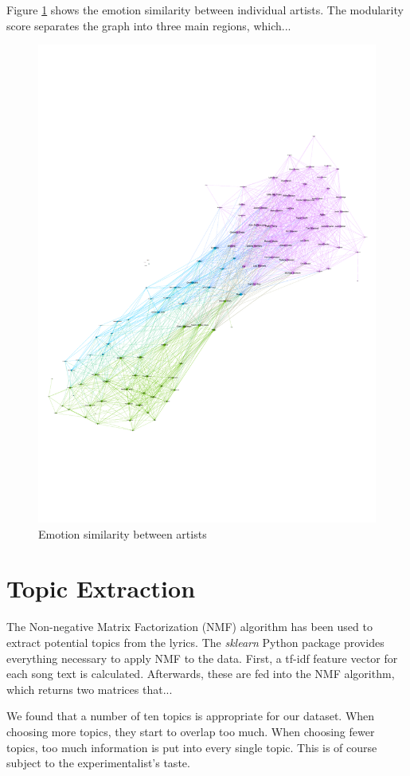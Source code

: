 \documentclass[10pt,a4paper]{article}
\begin{document}
		Figure \ref{fig:emotionsimilarity} shows the emotion similarity between individual artists. The modularity score separates the graph into three main regions, which...
		
		\begin{figure}[htb]
			\centering
			\includegraphics[trim=0mm 50mm 0mm 50mm, clip, width=0.7\linewidth]{data/emotion_similarity}
			\caption{Emotion similarity between artists}
			\label{fig:emotionsimilarity}
		\end{figure}
	
	\section{Topic Extraction}
	The Non-negative Matrix Factorization (NMF) algorithm has been used to extract potential topics from the lyrics. The \textit{sklearn} Python package provides everything necessary to apply NMF to the data. First, a tf-idf feature vector for each song text is calculated. Afterwards, these are fed into the NMF algorithm, which returns two matrices that...
	
	We found that a number of ten topics is appropriate for our dataset. When choosing more topics, they start to overlap too much. When choosing fewer topics, too much information is put into every single topic. This is of course subject to the experimentalist's taste.
	
\end{document}

